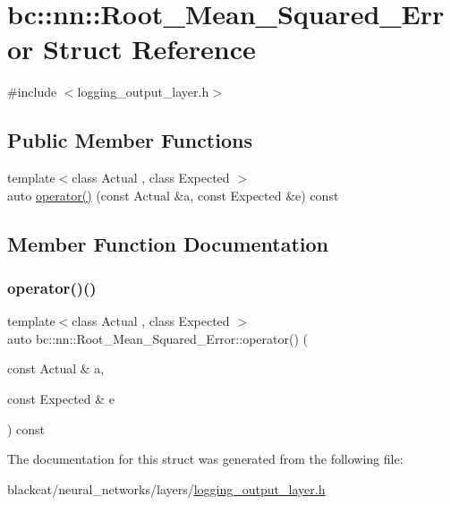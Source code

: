 \hypertarget{structbc_1_1nn_1_1Root__Mean__Squared__Error}{}\section{bc\+:\+:nn\+:\+:Root\+\_\+\+Mean\+\_\+\+Squared\+\_\+\+Error Struct Reference}
\label{structbc_1_1nn_1_1Root__Mean__Squared__Error}


{\ttfamily \#include $<$logging\+\_\+output\+\_\+layer.\+h$>$}

\subsection*{Public Member Functions}
\begin{DoxyCompactItemize}
\item 
{\footnotesize template$<$class Actual , class Expected $>$ }\\auto \hyperlink{structbc_1_1nn_1_1Root__Mean__Squared__Error_a646d6393b1959dd5d8b978d807d89a47}{operator()} (const Actual \&a, const Expected \&e) const
\end{DoxyCompactItemize}


\subsection{Member Function Documentation}
\mbox{\label{structbc_1_1nn_1_1Root__Mean__Squared__Error_a646d6393b1959dd5d8b978d807d89a47}} 
\subsubsection{\texorpdfstring{operator()()}{operator()()}}
{\footnotesize\ttfamily template$<$class Actual , class Expected $>$ \\
auto bc\+::nn\+::\+Root\+\_\+\+Mean\+\_\+\+Squared\+\_\+\+Error\+::operator() (\begin{DoxyParamCaption}\item[{const Actual \&}]{a,  }\item[{const Expected \&}]{e }\end{DoxyParamCaption}) const\hspace{0.3cm}{\ttfamily [inline]}}



The documentation for this struct was generated from the following file\+:\begin{DoxyCompactItemize}
\item 
blackcat/neural\+\_\+networks/layers/\hyperlink{logging__output__layer_8h}{logging\+\_\+output\+\_\+layer.\+h}\end{DoxyCompactItemize}
